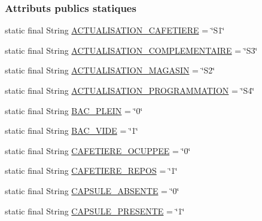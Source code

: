 \subsubsection*{Attributs publics statiques}
\begin{DoxyCompactItemize}
\item 
static final String \hyperlink{classcom_1_1example_1_1ekawa_1_1_protocole_ab35c00ac601a9f2037ba8c95d9c09983}{A\+C\+T\+U\+A\+L\+I\+S\+A\+T\+I\+O\+N\+\_\+\+C\+A\+F\+E\+T\+I\+E\+RE} = \char`\"{}S1\char`\"{}
\item 
static final String \hyperlink{classcom_1_1example_1_1ekawa_1_1_protocole_a7751357fc287fe44de89ebd3fc9cee9b}{A\+C\+T\+U\+A\+L\+I\+S\+A\+T\+I\+O\+N\+\_\+\+C\+O\+M\+P\+L\+E\+M\+E\+N\+T\+A\+I\+RE} = \char`\"{}S3\char`\"{}
\item 
static final String \hyperlink{classcom_1_1example_1_1ekawa_1_1_protocole_a8a6313d18d5ca2b55181302f6ec96330}{A\+C\+T\+U\+A\+L\+I\+S\+A\+T\+I\+O\+N\+\_\+\+M\+A\+G\+A\+S\+IN} = \char`\"{}S2\char`\"{}
\item 
static final String \hyperlink{classcom_1_1example_1_1ekawa_1_1_protocole_a8127ee50bdfb556779ad1c920c498e83}{A\+C\+T\+U\+A\+L\+I\+S\+A\+T\+I\+O\+N\+\_\+\+P\+R\+O\+G\+R\+A\+M\+M\+A\+T\+I\+ON} = \char`\"{}S4\char`\"{}
\item 
static final String \hyperlink{classcom_1_1example_1_1ekawa_1_1_protocole_a499d999d5a6644a3f02bc63bd764e469}{B\+A\+C\+\_\+\+P\+L\+E\+IN} = \char`\"{}0\char`\"{}
\item 
static final String \hyperlink{classcom_1_1example_1_1ekawa_1_1_protocole_a790736e534bd8f87d62c5e1bdb759f45}{B\+A\+C\+\_\+\+V\+I\+DE} = \char`\"{}1\char`\"{}
\item 
static final String \hyperlink{classcom_1_1example_1_1ekawa_1_1_protocole_a6ba36890a3e7ff61391884071fc25a21}{C\+A\+F\+E\+T\+I\+E\+R\+E\+\_\+\+O\+C\+U\+P\+P\+EE} = \char`\"{}0\char`\"{}
\item 
static final String \hyperlink{classcom_1_1example_1_1ekawa_1_1_protocole_a8a1722dd819850baa7e6ca765e66c581}{C\+A\+F\+E\+T\+I\+E\+R\+E\+\_\+\+R\+E\+P\+OS} = \char`\"{}1\char`\"{}
\item 
static final String \hyperlink{classcom_1_1example_1_1ekawa_1_1_protocole_ac7b6a2008b1195eae4628de3326bf97f}{C\+A\+P\+S\+U\+L\+E\+\_\+\+A\+B\+S\+E\+N\+TE} = \char`\"{}0\char`\"{}
\item 
static final String \hyperlink{classcom_1_1example_1_1ekawa_1_1_protocole_a4cd76f0386b4691063c48c0e4d8d8e40}{C\+A\+P\+S\+U\+L\+E\+\_\+\+P\+R\+E\+S\+E\+N\+TE} = \char`\"{}1\char`\"{}

\end{DoxyCompactItemize}
